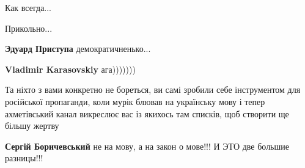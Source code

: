 \begin{itemize}
Как всегда...

 
Прикольно...

\begin{itemize}
 
\textbf{Эдуард Приступа} демократичненько...

 
\textbf{Vladimir Karasovskiy} ага)))))))
\end{itemize}

 

Та ніхто з вами конкретно не бореться, ви самі зробили себе інструментом для
російської пропаганди, коли мурік блював на українську мову і тепер
ахметівський канал викреслює вас із якихось там списків, щоб створити ще більшу
жертву

\begin{itemize}
 
\textbf{Сергій Боричевський} не на мову, а на закон о мове!!! И ЭТО две большие разницы!!!

 

\end{itemize}
\end{itemize}
